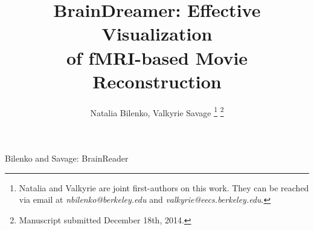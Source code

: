 \documentclass[journal]{IEEEtran}
\begin{document}

%
\title{BrainDreamer: Effective Visualization\\of fMRI-based Movie Reconstruction}
%
%
%

\author{Natalia Bilenko, Valkyrie Savage%
\thanks{Natalia and Valkyrie are joint first-authors on this work.  They can be reached via email at \emph{nbilenko@berkeley.edu} and \emph{valkyrie@eecs.berkeley.edu}.}%
\thanks{Manuscript submitted December 18th, 2014.}}



%
{Bilenko and Savage: BrainReader}










\maketitle
\end{document}
